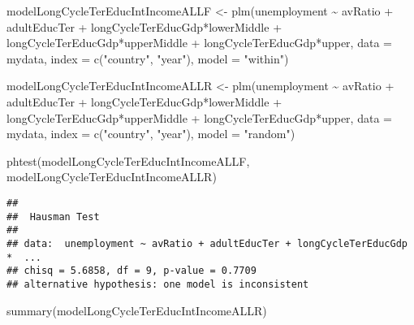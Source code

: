 \documentclass[
]{article}
\newenvironment{Shaded}{\begin{snugshade}}{\end{snugshade}}
\newcommand{\AttributeTok}[1]{\textcolor[rgb]{0.77,0.63,0.00}{#1}}
\newcommand{\FunctionTok}[1]{\textcolor[rgb]{0.00,0.00,0.00}{#1}}
\newcommand{\NormalTok}[1]{#1}
\newcommand{\OtherTok}[1]{\textcolor[rgb]{0.56,0.35,0.01}{#1}}
\newcommand{\SpecialCharTok}[1]{\textcolor[rgb]{0.00,0.00,0.00}{#1}}
\newcommand{\StringTok}[1]{\textcolor[rgb]{0.31,0.60,0.02}{#1}}
\begin{document}
\begin{Shaded}
\begin{Highlighting}[]
\NormalTok{modelLongCycleTerEducIntIncomeALLF }\OtherTok{\textless{}{-}} \FunctionTok{plm}\NormalTok{(unemployment }\SpecialCharTok{\textasciitilde{}}\NormalTok{  avRatio }\SpecialCharTok{+}\NormalTok{ adultEducTer }\SpecialCharTok{+}\NormalTok{ longCycleTerEducGdp}\SpecialCharTok{*}\NormalTok{lowerMiddle }\SpecialCharTok{+}\NormalTok{ longCycleTerEducGdp}\SpecialCharTok{*}\NormalTok{upperMiddle }\SpecialCharTok{+}\NormalTok{ longCycleTerEducGdp}\SpecialCharTok{*}\NormalTok{upper,}
             \AttributeTok{data =}\NormalTok{ mydata, }\AttributeTok{index =} \FunctionTok{c}\NormalTok{(}\StringTok{"country"}\NormalTok{, }\StringTok{"year"}\NormalTok{), }\AttributeTok{model =} \StringTok{"within"}\NormalTok{)}

\NormalTok{modelLongCycleTerEducIntIncomeALLR }\OtherTok{\textless{}{-}} \FunctionTok{plm}\NormalTok{(unemployment }\SpecialCharTok{\textasciitilde{}}\NormalTok{  avRatio }\SpecialCharTok{+}\NormalTok{ adultEducTer }\SpecialCharTok{+}\NormalTok{ longCycleTerEducGdp}\SpecialCharTok{*}\NormalTok{lowerMiddle }\SpecialCharTok{+}\NormalTok{ longCycleTerEducGdp}\SpecialCharTok{*}\NormalTok{upperMiddle }\SpecialCharTok{+}\NormalTok{ longCycleTerEducGdp}\SpecialCharTok{*}\NormalTok{upper,}
             \AttributeTok{data =}\NormalTok{ mydata, }\AttributeTok{index =} \FunctionTok{c}\NormalTok{(}\StringTok{"country"}\NormalTok{, }\StringTok{"year"}\NormalTok{), }\AttributeTok{model =} \StringTok{"random"}\NormalTok{)}

\FunctionTok{phtest}\NormalTok{(modelLongCycleTerEducIntIncomeALLF, modelLongCycleTerEducIntIncomeALLR)}
\end{Highlighting}
\end{Shaded}

\begin{verbatim}
## 
##  Hausman Test
## 
## data:  unemployment ~ avRatio + adultEducTer + longCycleTerEducGdp *  ...
## chisq = 5.6858, df = 9, p-value = 0.7709
## alternative hypothesis: one model is inconsistent
\end{verbatim}

\begin{Shaded}
\begin{Highlighting}[]
\FunctionTok{summary}\NormalTok{(modelLongCycleTerEducIntIncomeALLR)}
\end{Highlighting}
\end{Shaded}
\end{document}
